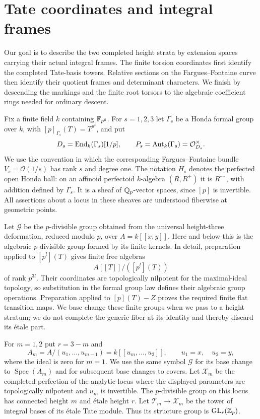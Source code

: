 \section{Tate coordinates and integral frames}\label{h3:sec:towers}

Our goal is to describe the two completed height strata by extension
spaces carrying their actual integral frames.  The finite torsion
coordinates first identify the completed Tate-basis towers.  Relative
sections on the Fargues--Fontaine curve then identify their quotient
frames and determinant characters.  We finish by descending the
markings and the finite root torsors to the algebraic coefficient rings
needed for ordinary descent.

Fix a finite field $k$ containing $\mathbb F_{p^6}$.  For $s=1,2,3$ let
$\Gamma_s$ be a Honda formal group over $k$, with
$[p]_{\Gamma_s}(T)=T^{p^s}$, and put
\[
 D_s=\operatorname{End}_k(\Gamma_s)[1/p],\qquad
 P_s=\operatorname{Aut}_k(\Gamma_s)=\mathcal O_{D_s}^{\times}.
\]
We use the convention in which the corresponding Fargues--Fontaine bundle
$V_s=\mathcal O(1/s)$ has rank $s$ and degree one.  The notation $H_s$
denotes the perfected open Honda ball: on an affinoid perfectoid
$k$-algebra $(R,R^+)$ it is $R^{\circ\circ}$, with addition defined by
$\Gamma_s$.  It is a sheaf of $\mathbb Q_p$-vector spaces, since $[p]$ is
invertible.  All assertions about a locus in these sheaves are understood
fiberwise at geometric points.

Let $\mathcal G$ be the $p$-divisible group obtained from the universal
height-three deformation, reduced modulo $p$, over $A=k[[x,y]]$.
Here and below this is the algebraic $p$-divisible group formed by its
finite kernels.  In detail, preparation applied to $[p^l](T)$ gives
finite free algebras
\[
 A[[T]]/([p^l](T))
\]
of rank $p^{3l}$.  Their coordinates are topologically nilpotent for the
maximal-ideal topology, so substitution in the formal group law defines
their algebraic group operations.  Preparation applied to
$[p](T)-Z$ proves the required finite flat transition maps.  We base
change these finite groups when we pass to a height stratum; we do not
complete the generic fiber at its identity and thereby discard its
\'etale part.

For $m=1,2$ put $r=3-m$ and
\[
 A_m=A/(u_1,\ldots,u_{m-1})=k[[u_m,\ldots,u_2]],
 \qquad u_1=x,\quad u_2=y,
\]
where the ideal is zero for $m=1$.  We use the same symbol
$\mathcal G$ for its base change to $\operatorname{Spec}(A_m)$ and
for subsequent base changes to covers.  Let $\mathcal X_m$ be the completed perfection of the analytic locus
where the displayed parameters are topologically nilpotent and $u_m$
is invertible.  The $p$-divisible group on this locus has connected
height $m$ and \'etale height $r$.  Let $\mathcal T_m\to\mathcal X_m$
be the tower of integral bases of its \'etale Tate module.  Thus its
structure group is $\operatorname{GL}_r(\mathbb Z_p)$.

